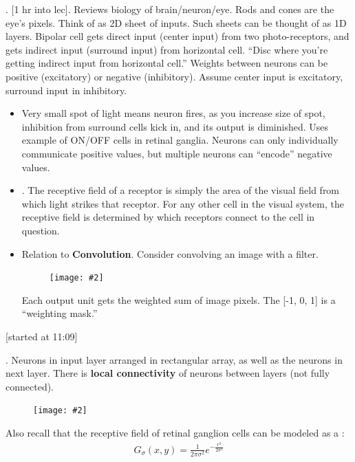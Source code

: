 \documentclass[12pt]{article}
\newcommand\myfig[2][0.3\textwidth]{\begin{figure}[h!]\centering\texttt{[image: \#2]}\end{figure}}
\newcommand{\myspace}{\vspace{2\bigskipamount}}
\newcommand\p{\Needspace{10\baselineskip} \noindent}
\begin{document}
\myspace
\p {}. [1 hr into lec]. Reviews biology of brain/neuron/eye. Rods and cones are the eye's pixels. Think of as 2D sheet of inputs. Such sheets can be thought of as 1D layers. Bipolar cell gets direct input (center input) from two photo-receptors, and gets indirect input (surround input) from horizontal cell. ``Disc where you're getting indirect input from horizontal cell.'' Weights between neurons can be positive (excitatory) or negative (inhibitory). Assume center input is excitatory, surround input in inhibitory. 
\begin{itemize}
	\item Very small spot of light means neuron fires, as you increase size of spot, inhibition from surround cells kick in, and its output is diminished. Uses example of ON/OFF cells in retinal ganglia. Neurons can only individually communicate positive values, but multiple neurons can ``encode'' negative values. 
	
	\item {}. The receptive field of a receptor is simply the area of the visual field from which light strikes that receptor. For any other cell in the visual system, the receptive field is determined by which receptors connect to the cell in question. 
	
	\item Relation to \textbf{Convolution}. Consider convolving an image with a filter. \myfig{Conv.PNG}
	
	
	\subitem Each output unit gets the weighted sum of image pixels. The [-1, 0, 1] is a ``weighting mask.''
\end{itemize}

[started at 11:09]

\p {}. Neurons in input layer arranged in rectangular array, as well as the neurons in next layer. There is \textbf{local connectivity} of neurons between layers (not fully connected). \myfig{LocalConnectivity.PNG} 

\noindent Also recall that the receptive field of retinal ganglion cells can be modeled as a :
\begin{align}
G_\sigma(x, y) = \frac{1}{2\pi \sigma^2} e^{-\frac{r^2}{2\sigma^2}}
\end{align}
\end{document}
